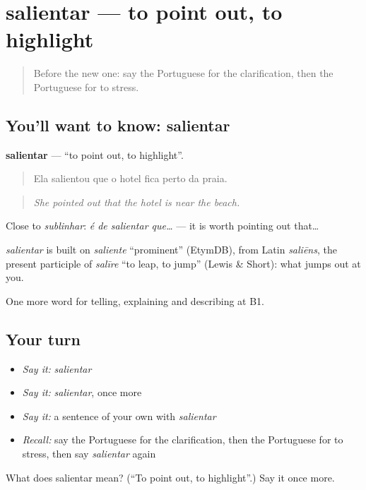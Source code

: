 \section[salientar]{salientar — to point out, to highlight}

\label{lesson:PT-C343-salientar}



\begin{quote}
Before the new one: say the Portuguese for the clarification, then the Portuguese for to stress.
\end{quote}

\subsection*{You'll want to know: salientar}
\textbf{salientar} — \textquotedblleft{}to point out, to highlight\textquotedblright{}.

\begin{quote}
Ela salientou que o hotel fica perto da praia.
\end{quote}

\begin{quote}
\emph{She pointed out that the hotel is near the beach.}
\end{quote}

Close to \emph{sublinhar}: \emph{é de salientar que…} — it is worth pointing out that…

\begin{cousinweb}
\emph{salientar} is built on \emph{saliente} \textquotedblleft{}prominent\textquotedblright{} (EtymDB), from Latin \emph{saliēns}, the present participle of \emph{salīre} \textquotedblleft{}to leap, to jump\textquotedblright{} (Lewis \& Short): what jumps out at you.
\end{cousinweb}

\begin{grammarlens}[title={What you've built}]
One more word for telling, explaining and describing at B1.
\end{grammarlens}

\subsection*{Your turn}
\begin{itemize}
\raggedright
  \item \emph{Say it:} \emph{salientar}
  \item \emph{Say it:} \emph{salientar}, once more
  \item \emph{Say it:} a sentence of your own with \emph{salientar}
  \item \emph{Recall:} say the Portuguese for the clarification, then the Portuguese for to stress, then say \emph{salientar} again
\end{itemize}

\begin{tcolorbox}[breakable,colback=teal!4,colframe=teal!35!black,title={Before you move on}]
What does salientar mean? (\textquotedblleft{}To point out, to highlight\textquotedblright{}.) Say it once more.
\end{tcolorbox}
